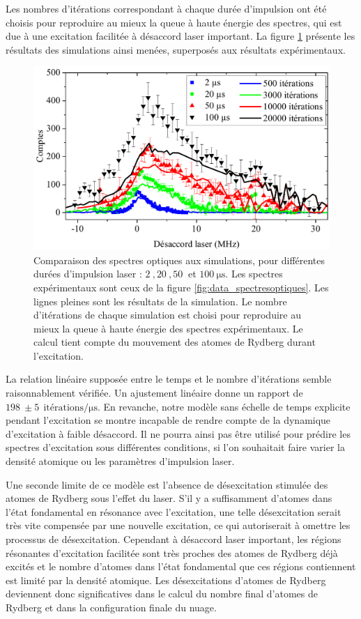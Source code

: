 Les nombres d'itérations correspondant à chaque durée d'impulsion ont été choisis pour reproduire au mieux la queue à haute énergie des spectres, qui est due à une excitation facilitée à désaccord laser important.
La figure \ref{fig:opt_spectra_firstTest} présente les résultats des simulations ainsi menées, superposés aux résultats expérimentaux.
%
\begin{figure}[!h]
\centering
\includegraphics[width=\linewidth]{figures/low_l/raies_laser_vieilles_simus}
\caption[Comparaison des spectres optiques au premier modèle de simulation]{
Comparaison des spectres optiques aux simulations, pour différentes durées d'impulsion laser : $\SI{2}{},\SI{20}{},\SI{50}{}$ et $\SI{100}{\us}$.
Les spectres expérimentaux sont ceux de la figure \ref{fig:data_spectresoptiques}.
Les lignes pleines sont les résultats de la simulation.
Le nombre d'itérations de chaque simulation est choisi pour reproduire au mieux la queue à haute énergie des spectres expérimentaux.
Le calcul tient compte du mouvement des atomes de Rydberg durant l'excitation.
}
\label{fig:opt_spectra_firstTest}
\end{figure}
%
La relation linéaire supposée entre le temps et le nombre d'itérations semble raisonnablement vérifiée.
Un ajustement linéaire donne un rapport de $\SI{198}{} \pm \SI{5}{~} \text{itérations}/\si{\us}$.
En revanche, notre modèle sans échelle de temps explicite pendant l'excitation se montre incapable de rendre compte de la dynamique d'excitation à faible désaccord.
Il ne pourra ainsi pas être utilisé pour prédire les spectres d'excitation sous différentes conditions, si l'on souhaitait faire varier la densité atomique ou les paramètres d'impulsion laser.

Une seconde limite de ce modèle est l'absence de désexcitation stimulée des atomes de Rydberg sous l'effet du laser.
S'il y a suffisamment d'atomes dans l'état fondamental en résonance avec l'excitation, une telle désexcitation serait très vite compensée par une nouvelle excitation, ce qui autoriserait à omettre les processus de désexcitation.
Cependant à désaccord laser important, les régions résonantes d'excitation facilitée sont très proches des atomes de Rydberg déjà excités et le nombre d'atomes dans l'état fondamental que ces régions contiennent est limité par la densité atomique.
Les désexcitations d'atomes de Rydberg deviennent donc significatives dans le calcul du nombre final d'atomes de Rydberg et dans la configuration finale du nuage.


